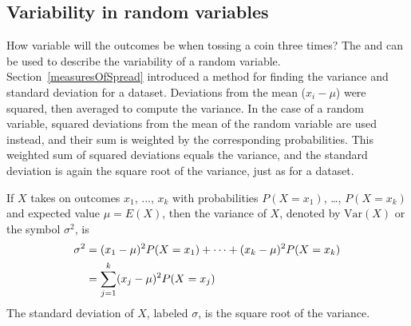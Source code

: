 


\subsection{Variability in random variables}

How variable will the outcomes be when tossing a coin three times?  The  and  can be used to describe the variability of a random variable. Section~\ref{measuresOfSpread} introduced a method for finding the variance and standard deviation for a dataset.  Deviations from the mean ($x_i - \mu$) were squared, then averaged to compute the variance. In the case of a random variable, squared deviations from the mean of the random variable are used instead, and their sum is weighted by the corresponding probabilities. This weighted sum of squared deviations equals the variance, and the standard deviation is again the square root of the variance, just as for a dataset.

\begin{termBox}{
If $X$ takes on outcomes $x_1$, ..., $x_k$ with probabilities $P(X=x_1)$, \dots, $P(X=x_k)$ and expected value $\mu=E(X)$, then the variance of $X$, denoted by $\text{Var}(X)$ or the symbol $\sigma^2$, is
\begin{align}
\sigma^2 &= (x_1-\mu)^2 P(X=x_1) + \cdots \notag + (x_k-\mu)^2 P(X=x_k) \notag \\
	&= \sum_{j=1}^{k} (x_j - \mu)^2 P(X=x_j)
\end{align}
The standard deviation of $X$, labeled $\sigma$, is the square root of the variance.}
\end{termBox}

